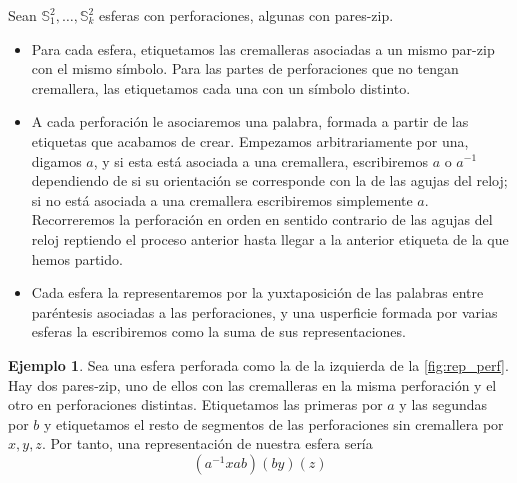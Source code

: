 \documentclass[10pt]{report}
\newcommand{\Esfera}{\mathbb{S}^2}
\theoremstyle{definition}
\newtheorem{eje}[defin]{Ejemplo}
\begin{document}
Sean $\Esfera_1,\dots ,\Esfera_k$ esferas con perforaciones, algunas con pares-zip. 
\begin{itemize}

\item Para cada esfera, etiquetamos las cremalleras asociadas a un mismo par-zip con el mismo símbolo. Para las partes de perforaciones que no tengan cremallera, las etiquetamos cada una con un símbolo distinto. 
\item A cada perforación le asociaremos una palabra, formada a partir de las etiquetas que acabamos de crear. Empezamos arbitrariamente por una, digamos $a$, y si esta está asociada a una cremallera, escribiremos $a$ o $a^{-1}$ dependiendo de si su orientación se corresponde con la de las agujas del reloj; si no está asociada a una cremallera escribiremos simplemente $a$. Recorreremos la perforación en orden en sentido contrario de las agujas del reloj reptiendo el proceso anterior hasta llegar a la anterior etiqueta de la que hemos partido.
\item Cada esfera la representaremos por la yuxtaposición de las palabras entre paréntesis asociadas a las perforaciones, y una usperficie formada por varias esferas la escribiremos como la suma de sus representaciones.
\end{itemize}
\begin{eje}\label{eje:rep_perf}
Sea una esfera perforada como la de la izquierda de la \autoref{fig:rep_perf}. Hay dos pares-zip, uno de ellos con las cremalleras en la misma perforación y el otro en perforaciones distintas. Etiquetamos las primeras por $a$ y las segundas por $b$ y etiquetamos el resto de segmentos de las perforaciones sin cremallera por $x,y,z$. Por tanto, una representación de nuestra esfera sería $$(a^{-1}xab)(by)(z)$$
\end{eje}
\end{document}
